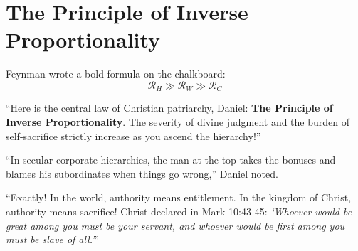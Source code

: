 \documentclass[11pt]{report}
\begin{document}
\section{The Principle of Inverse Proportionality}
Feynman wrote a bold formula on the chalkboard:
\begin{equation}
    \mathcal{R}_H \gg \mathcal{R}_W \gg \mathcal{R}_C
\end{equation}

``Here is the central law of Christian patriarchy, Daniel: \textbf{The Principle of Inverse Proportionality}. The severity of divine judgment and the burden of self-sacrifice strictly increase as you ascend the hierarchy!''

``In secular corporate hierarchies, the man at the top takes the bonuses and blames his subordinates when things go wrong,'' Daniel noted.

``Exactly! In the world, authority means entitlement. In the kingdom of Christ, authority means sacrifice! Christ declared in Mark 10:43-45: \textit{`Whoever would be great among you must be your servant, and whoever would be first among you must be slave of all.'}''
\end{document}
